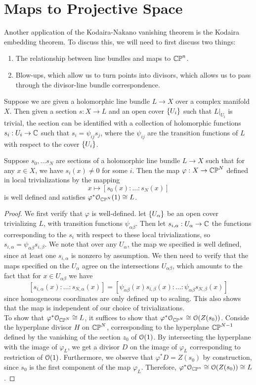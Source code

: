 %
\section{Maps to Projective Space}
%
Another application of the Kodaira-Nakano vanishing theorem is the Kodaira embedding
theorem. To discuss this, we will need to first discuss two things:
%
\begin{enumerate}
  \item The relationship between line bundles and maps to $\mathbb{CP}^n$.
  \item Blow-ups, which allow us to turn points into divisors, which
  allows us to pass through the divisor-line bundle correspondence.
\end{enumerate}
%
Suppose we are given a holomorphic line bundle $L \to X$ over a complex manifold
$X$. Then given a section $s : X \to L$ and an open cover $\left\lbrace U_i \right\rbrace$
such that $L\vert_{U_i}$ is trivial, the section can be identified with
a collection of holomorphic functions $s_i : U_i \to \mathbb{C}$ such that
$s_i = \psi_{ij}s_j$, where the $\psi_{ij}$ are the transition functions of
$L$ with respect to the cover $\left\lbrace U_i \right\rbrace$.
%
\begin{prop}
Suppose $s_0,\ldots s_N$ are sections of a holomorphic line bundle $L \to X$ such
that for any $x \in X$, we have $s_i(x) \neq 0$ for some $i$. Then the map
$\varphi : X \to \mathbb{CP}^N$ defined in local trivializations by the mapping
\[
x \mapsto [s_0(x): \ldots :s_N(x)]
\]
is well defined and satisfies $\varphi^*\mathcal{O}_{\mathbb{CP}^N}(1) \cong L$.
\end{prop}
%
\begin{proof}
We first verify that $\varphi$ is well-defined. let $\left\lbrace U_\alpha \right\rbrace$ be
an open cover trivializing $L$, with transition functions $\psi_{\alpha\beta}$.
Then let $s_{i,\alpha} : U_\alpha \to \mathbb{C}$ the functions corresponding to the $s_i$
with respect to these local trivializations, so
$s_{i,\alpha} = \psi_{\alpha\beta}s_{i,\beta}$. We note that over any
$U_\alpha$, the map we specified is well defined, since at least one
$s_{i,\alpha}$ is nonzero by assumption. We then need to verify that
the maps specified on the $U_\alpha$ agree on the intersections $U_{\alpha\beta}$,
which amounts to the fact that for $x \in U_{\alpha\beta}$ we have
\[
[s_{i,\alpha}(x):\ldots :s_{N,\alpha}(x)] =
[\psi_{\alpha\beta}(x)s_{i,\beta}(x): \ldots : \psi_{\alpha\beta}s_{N,\beta}(x)]
\]
since homogeneous coordinates are only defined up to scaling. This also shows
that the map is independent of our choice of trivializations. \\

To show that $\varphi^*\mathcal{O}_{\mathbb{CP}^N} \cong L$, it suffices to show that
$\varphi^*\mathcal{O}_{\mathbb{CP}^N} \cong \mathcal{O}(Z(s_0))$. Conside the hyperplane divisor
$H$ on $\mathbb{CP}^N$, corresponding to the hyperplane $\mathbb{CP}^{N-1}$ defined by
the vanishing of the section $z_0$ of $\mathcal{O}(1)$. By intersecting the hyperplane
with the image of $\varphi_L$, we get a divisor $D$ on the image of $\varphi_L$
corresponding to restriction of $\mathcal{O}(1)$. Furthermore, we observe that
$\varphi^*D = Z(s_0)$ by construction, since $s_0$ is the first component
of the map $\varphi_L$. Therefore, $\varphi^*\mathcal{O}_{\mathbb{CP}^n} \cong \mathcal{O}(Z(s_0)) \cong L$.
\end{proof}
